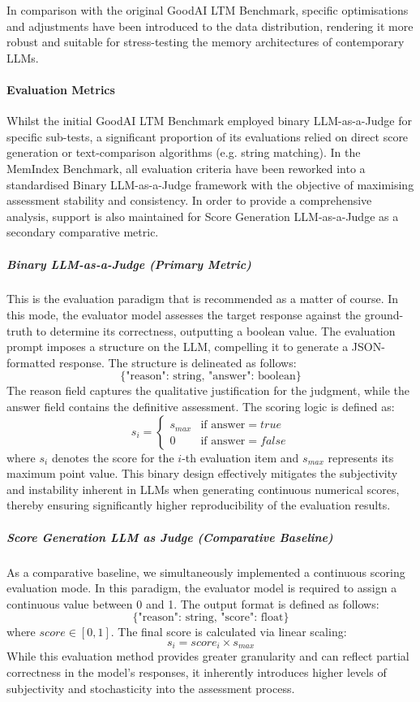 In comparison with the original GoodAI LTM Benchmark, specific optimisations and adjustments have been introduced to the data distribution, rendering it more robust and suitable for stress-testing the memory architectures of contemporary LLMs.

\paragraph{Evaluation Metrics}
Whilst the initial GoodAI LTM Benchmark employed binary LLM-as-a-Judge for specific sub-tests, a significant proportion of its evaluations relied on direct score generation or text-comparison algorithms (e.g. string matching). In the MemIndex Benchmark, all evaluation criteria have been reworked into a standardised Binary LLM-as-a-Judge framework with the objective of maximising assessment stability and consistency. In order to provide a comprehensive analysis, support is also maintained for Score Generation LLM-as-a-Judge as a secondary comparative metric.

\subparagraph{Binary LLM-as-a-Judge (Primary Metric)}
This is the evaluation paradigm that is recommended as a matter of course. In this mode, the evaluator model assesses the target response against the ground-truth to determine its correctness, outputting a boolean value. The evaluation prompt imposes a structure on the LLM, compelling it to generate a JSON-formatted response. The structure is delineated as follows:
$$
\{\text{"reason": string, "answer": boolean}\}
$$
The reason field captures the qualitative justification for the judgment, while the answer field contains the definitive assessment. The scoring logic is defined as:
$$
s_i = \begin{cases} s_{max} & \text{if answer} = true \\ 0 & \text{if answer} = false \end{cases}
$$
where $s_i$ denotes the score for the $i$-th evaluation item and $s_{max}$ represents its maximum point value. This binary design effectively mitigates the subjectivity and instability inherent in LLMs when generating continuous numerical scores, thereby ensuring significantly higher reproducibility of the evaluation results.

\subparagraph{Score Generation LLM as Judge (Comparative Baseline)}

As a comparative baseline, we simultaneously implemented a continuous scoring evaluation mode. In this paradigm, the evaluator model is required to assign a continuous value between 0 and 1. The output format is defined as follows:
$$
\{\text{"reason": string, "score": float}\}
$$
where $score \in [0, 1]$. The final score is calculated via linear scaling:
$$
s_i = score_i \times s_{max}
$$
While this evaluation method provides greater granularity and can reflect partial correctness in the model's responses, it inherently introduces higher levels of subjectivity and stochasticity into the assessment process.


